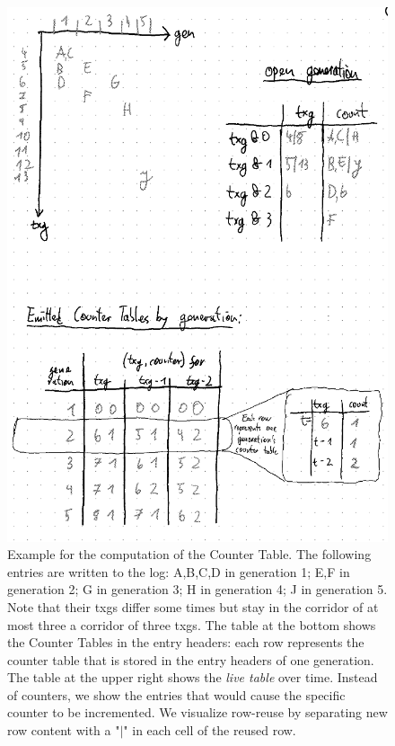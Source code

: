 \documentclass[12pt,a4paper,twoside]{book}
\begin{document}
\begin{figure}[H]
    \centering
    \includegraphics[width=\textwidth]{fig/prb_counters_table__example}
    \caption{
        Example for the computation of the Counter Table.
        The following entries are written to the log:
        A,B,C,D in generation 1; E,F in generation 2; G in generation 3; H in generation 4; J in generation 5.
        Note that their txgs differ some times but stay in the corridor of at most three a corridor of three txgs.
        The table at the bottom shows the Counter Tables in the entry headers:
        each row represents the counter table that is stored in the entry headers of one generation.
        The table at the upper right shows the \textit{live table} over time.
        Instead of counters, we show the entries that would cause the specific counter to be incremented.
        We visualize row-reuse by separating new row content with a "$|$" in each cell of the reused row.
    }
    \label{fig:prb_counters_table__example}
\end{figure}
\end{document}
